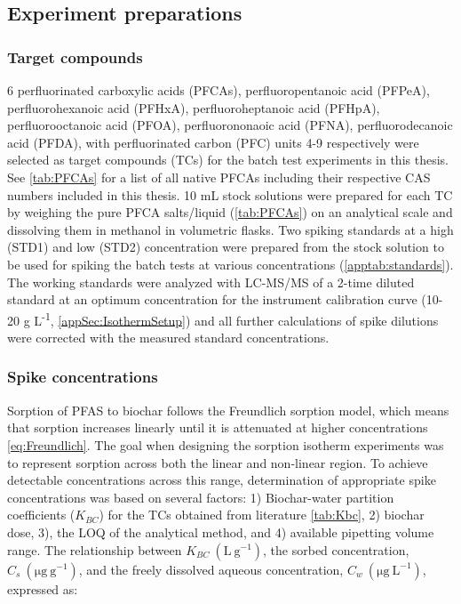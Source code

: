 \subsection{Experiment preparations}
\subsubsection{Target compounds}\label{sec:PFCAanalytic}
6 perfluorinated carboxylic acids (PFCAs), perfluoropentanoic acid (PFPeA), perfluorohexanoic acid (PFHxA), perfluoroheptanoic acid (PFHpA), perfluorooctanoic acid (PFOA), perfluorononaoic acid (PFNA), perfluorodecanoic acid (PFDA), with perfluorinated carbon (PFC) units 4-9 respectively were selected as target compounds (TCs) for the batch test experiments in this thesis. See \cref{tab:PFCAs} for a list of all native PFCAs including their respective CAS numbers included in this thesis. 10 mL stock solutions were prepared for each TC by weighing the pure PFCA salts/liquid (\cref{tab:PFCAs}) on an analytical scale and dissolving them in methanol in volumetric flasks. Two spiking standards at a high (STD1) and low (STD2) concentration were prepared from the stock solution to be used for spiking the batch tests at various concentrations (\cref{apptab:standards}). The working standards were analyzed with LC-MS/MS of a 2-time diluted standard at an optimum concentration for the instrument calibration curve (10-20 \textmu g L\textsuperscript{-1}, \cref{appSec:IsothermSetup}) and all further calculations of spike dilutions were corrected with the measured standard concentrations.



\subsubsection{Spike concentrations}
Sorption of PFAS to biochar follows the Freundlich sorption model, which means that sorption increases linearly until it is attenuated at higher concentrations \cref{eq:Freundlich}. The goal when designing the sorption isotherm experiments was to represent sorption across both the linear and non-linear region. To achieve detectable concentrations across this range, determination of appropriate spike concentrations was based on several factors: 1) Biochar-water partition coefficients ($K_{BC}$) for the TCs obtained from literature \cite{Xiao2017} \cref{tab:Kbc}, 2) biochar dose, 3), the LOQ of the analytical method, and 4) available pipetting volume range. The relationship between $K_{BC}~\mathrm{(L~g^{-1})}$, the sorbed concentration, $C_s~\mathrm{(\mu g~g^{-1})}$, and the freely dissolved aqueous concentration, $C_w~\mathrm{(\mu g~L^{-1})}$, expressed as:

